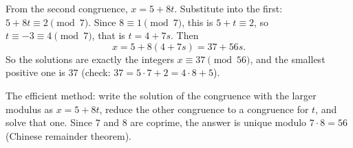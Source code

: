 From the second congruence, $x=5+8t$. Substitute into the first: $5+8t\equiv2\pmod7$. Since $8\equiv1\pmod7$, this is $5+t\equiv2$, so $t\equiv-3\equiv4\pmod7$, that is $t=4+7s$. Then
\[
x=5+8(4+7s)=37+56s .
\]
So the solutions are exactly the integers $x\equiv37\pmod{56}$, and the smallest positive one is $\boxed{37}$ (check: $37=5\cdot7+2=4\cdot8+5$).

The efficient method: write the solution of the congruence with the larger modulus as $x=5+8t$, reduce the other congruence to a congruence for $t$, and solve that one. Since $7$ and $8$ are coprime, the answer is unique modulo $7\cdot8=56$ (Chinese remainder theorem).
